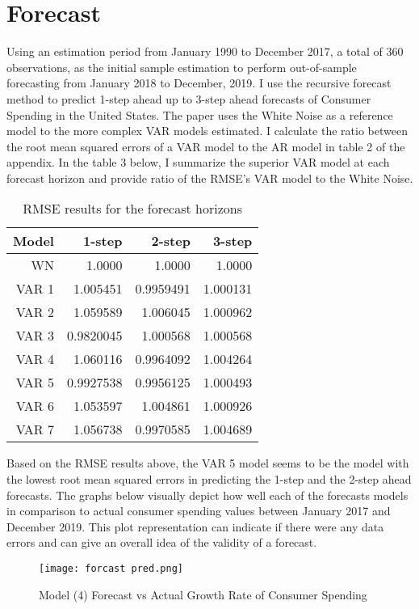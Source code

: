 \documentclass[12pt]{article}
\newcommand{\newpar}{\vspace{0.15in} \noindent}
\begin{document}
\section{Forecast}
Using an estimation period from January 1990 to December 2017,  a total of 360 observations, as the initial sample estimation to perform out-of-sample forecasting from January 2018 to December, 2019. I use the recursive forecast method to predict 1-step ahead up to 3-step ahead forecasts of Consumer Spending in the United States.
\newpar
\newline
The paper uses the White Noise as a reference model to the more complex VAR models estimated. I calculate the ratio between the root mean squared errors of a VAR model to the AR model in table 2 of the appendix. In the table 3 below, I summarize the superior VAR model at each forecast horizon and provide ratio of the RMSE’s VAR model to the White Noise.
\newpar
\newpar
\newpar
\newpar
\newpar
\begin{table}[ht]
\centering
\begin{tabular}{|r|r|r|r|}
  \hline
Model  & 1-step & 2-step & 3-step \\ 
\hline
\hline
WN &  1.0000 & 1.0000 & 1.0000  \\
\hline
VAR 1 & 1.005451 & 0.9959491 & 1.000131  \\
\hline
VAR 2 & 1.059589 & 1.006045 & 1.000962  \\
\hline
VAR 3 & 0.9820045 & 1.000568 & 1.000568  \\
\hline
VAR 4 & 1.060116 & 0.9964092 & 1.004264  \\
\hline
VAR 5 & 0.9927538 & 0.9956125 & 1.000493  \\
\hline
VAR 6 & 1.053597 & 1.004861 & 1.000926  \\
\hline
VAR 7 & 1.056738 & 0.9970585 & 1.004689  \\
\hline
\end{tabular}
\caption{RMSE results for the forecast horizons}
\end{table}
\newline
Based on the RMSE results above, the VAR 5 model seems to be the model with the lowest root mean squared errors in predicting the 1-step and the 2-step ahead forecasts. The graphs below visually depict how well each of the forecasts models in comparison to actual consumer spending values between January 2017 and December 2019. This plot representation can indicate if there were any data errors and can give an overall idea of the validity of a forecast.
\begin{figure}[!hbt]
     \center
     \caption{Model (4) Forecast vs Actual Growth Rate of Consumer Spending}
     \texttt{[image: forcast pred.png]}
\end{figure}
\newpar
\newpar
\newpar
\newpar
\newpar
\newpar
\newpar
\newpar
\newline
\end{document}
